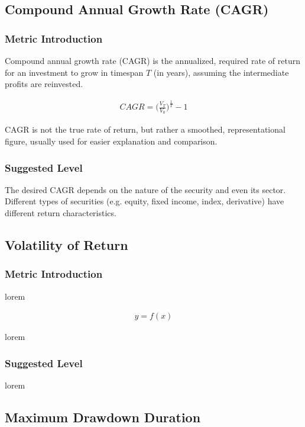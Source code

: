 \documentclass[12pt]{article}
\begin{document}
\subsection{Compound Annual Growth Rate (CAGR)}

\subsubsection*{Metric Introduction}

Compound annual growth rate (CAGR) is the annualized, required rate of return for an investment to grow in timespan \(T\) (in years), assuming the intermediate profits are reinvested.

\begin{align*}
  CAGR = \bigg(\frac{V_T}{V_0} \bigg)^{\frac{1}{T}}-1
\end{align*}

CAGR is not the true rate of return, but rather a smoothed, representational figure, usually used for easier explanation and comparison.

\subsubsection*{Suggested Level}

The desired CAGR depends on the nature of the security and even its sector. Different types of securities (e.g. equity, fixed income, index, derivative) have different return characteristics.

\subsection{Volatility of Return}

\subsubsection*{Metric Introduction}

lorem

\begin{align*}
  y = f(x)
\end{align*}

lorem

\subsubsection*{Suggested Level}

lorem

\subsection{Maximum Drawdown Duration}
\end{document}
